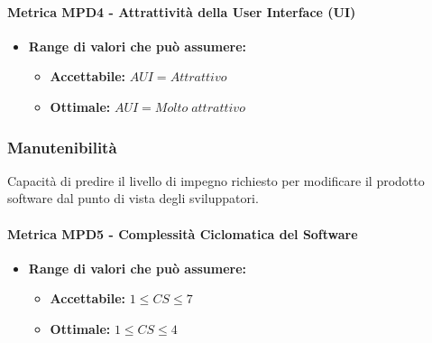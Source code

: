 \paragraph{Metrica MPD4 - Attrattività della User Interface (UI)} 
\begin{itemize}
    \item \textbf{Range di valori che può assumere:}
        \begin{itemize}
            \item \textbf{Accettabile:} $AUI = Attrattivo$ 
            \item \textbf{Ottimale:} $AUI = Molto \; attrattivo$
        \end{itemize}
\end{itemize}

\subsubsection{Manutenibilità} 
Capacità di predire il livello di impegno richiesto per modificare il prodotto software dal punto di vista degli sviluppatori.           
\paragraph{Metrica MPD5 - Complessità Ciclomatica del Software} 
    \begin{itemize}
    \item \textbf{Range di valori che può assumere:}
    \begin{itemize}
        \item \textbf{Accettabile:} $1 \leq CS \leq 7 $
        \item \textbf{Ottimale:} $ 1 \leq CS \leq 4 $
    \end{itemize}
\end{itemize}

